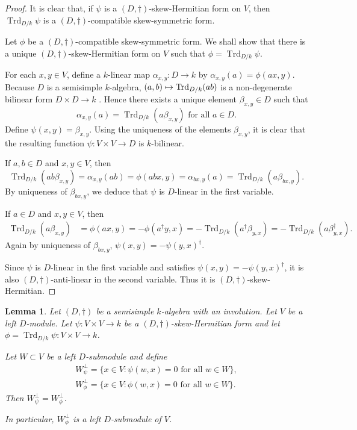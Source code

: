 \documentclass[11pt]{article}
\numberwithin{equation}{section}
\def\mto{\mathchoice{\longmapsto}{\mapsto}{\mapsto}{\mapsto}}
\DeclareMathOperator{\Trd}{Trd}
\newtheorem{lemma}{Lemma}[section]
\begin{document}
\begin{proof}
It is clear that, if $\psi$ is a $(D,\dag)$-skew-Hermitian form on $V$, then $\Trd_{D/k} \psi$ is a $(D,\dag)$-compatible skew-symmetric form.

Let $\phi$ be a $(D,\dag)$-compatible skew-symmetric form.
We shall show that there is a unique $(D,\dag)$-skew-Hermitian form on $V$ such that $\phi = \Trd_{D/k} \psi$.

For each $x,y \in V$, define a $k$-linear map $\alpha_{x,y} \colon D \to k$ by $\alpha_{x,y}(a) = \phi(ax, y)$.
Because $D$ is a semisimple $k$-algebra, $(a,b) \mto \Trd_{D/k}(ab)$ is a non-degenerate bilinear form $D \times D \to k$ \cite[Th.\,9.26]{Rei75}.
Hence there exists a unique element $\beta_{x,y} \in D$ such that
\[
\alpha_{x,y}(a) = \Trd_{D/k}(a\beta_{x,y}) \text{ for all } a \in D.
\]
Define $\psi(x,y) = \beta_{x,y}$.
Using the uniqueness of the elements $\beta_{x,y}$, it is clear that the resulting function $\psi \colon V \times V \to D$ is $k$-bilinear.

If $a, b \in D$ and $x,y \in V$, then
\[
\Trd_{D/k}(ab\beta_{x,y}) = \alpha_{x,y}(ab) = \phi(abx, y) = \alpha_{bx,y}(a) = \Trd_{D/k}(a\beta_{bx,y}).
\]
By uniqueness of $\beta_{bx,y}$, we deduce that $\psi$ is $D$-linear in the first variable.

If $a \in D$ and $x, y \in V$, then
\begin{align*}
\Trd_{D/k}(a\beta_{x,y})
& = \phi(ax, y) = -\phi(a^\dag y, x)
= -\Trd_{D/k}(a^\dag \beta_{y, x}) = -\Trd_{D/k}(a\beta_{y,x}^\dag).
\end{align*}
Again by uniqueness of $\beta_{bx,y}$, $\psi(x,y) = -\psi(y,x)^\dag$.

Since $\psi$ is $D$-linear in the first variable and satisfies $\psi(x,y) = -\psi(y,x)^\dag$, it is also $(D,\dag)$-anti-linear in the second variable.
Thus it is $(D,\dag)$-skew-Hermitian.
\end{proof}

\begin{lemma} \label{orthog-complements}
Let $(D, \dag)$ be a semisimple $k$-algebra with an involution.
Let $V$ be a left $D$-module.
Let $\psi \colon V \times V \to k$ be a $(D,\dag)$-skew-Hermitian form and let $\phi = \Trd_{D/k} \psi \colon V \times V \to k$.

Let $W \subset V$ be a left $D$-submodule and define
\begin{gather*}
W_\psi^\perp = \{ x \in V : \psi(w,x) = 0 \text{ for all } w \in W \},
\\ W_\phi^\perp = \{ x \in V : \phi(w,x) = 0 \text{ for all } w \in W \}.
\end{gather*}
Then $W_\psi^\perp = W_\phi^\perp$.

In particular, $W_\phi^\perp$ is a left $D$-submodule of $V$.
\end{lemma}
\end{document}
